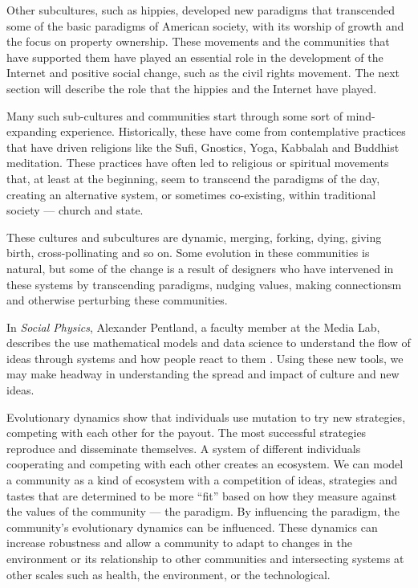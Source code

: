 Other subcultures, such as hippies, developed new paradigms that transcended some of the basic paradigms of American society, with its worship of growth and the focus on property ownership. These movements and the communities that have supported them have played an essential role in the development of the Internet and positive social change, such as the civil rights movement. The next section will describe the role that the hippies and the Internet have played.

Many such sub-cultures and communities start through some sort of mind-expanding experience. Historically, these have come from contemplative practices that have driven religions like the Sufi, Gnostics, Yoga, Kabbalah and Buddhist meditation. These practices have often led to religious or spiritual movements that, at least at the beginning, seem to transcend the paradigms of the day, creating an alternative system, or sometimes co-existing, within traditional society --- church and state.

These cultures and subcultures are dynamic, merging, forking, dying, giving birth, cross-pollinating and so on. Some evolution in these communities is natural, but some of the change is a result of designers who have intervened in these systems by transcending paradigms, nudging values, making connectionsm and otherwise perturbing these communities.

In \textit{Social Physics}, Alexander Pentland, a faculty member at the Media Lab, describes the use mathematical models and data science to understand the flow of ideas through systems and how people react to them \cite{pentland2015social}. Using these new tools, we may make headway in understanding the spread and impact of culture and new ideas.

Evolutionary dynamics show that individuals use mutation to try new strategies, competing with each other for the payout. The most successful strategies reproduce and disseminate themselves. A system of different individuals cooperating and competing with each other creates an ecosystem. We can model a community as a kind of ecosystem with a competition of ideas, strategies and tastes that are determined to be more ``fit'' based on how they measure against the values of the community --- the paradigm. By influencing the paradigm, the community's evolutionary dynamics can be influenced. These dynamics can increase robustness and allow a community to adapt to changes in the environment or its relationship to other communities and intersecting systems at other scales such as health, the environment, or the technological.

